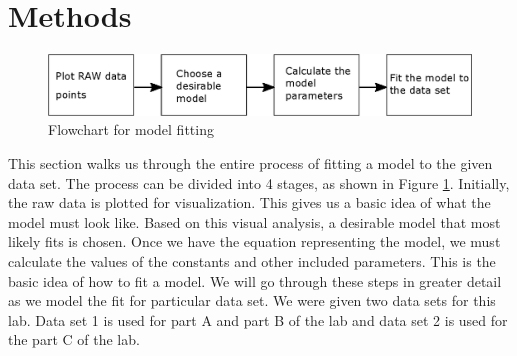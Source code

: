 \documentclass[12pt]{article}
\begin{document}
\section{Methods}
\begin{figure}[h]
\centering
	\includegraphics[width=\textwidth]{flowchart}
	\caption{Flowchart for model fitting }
	\label{fig:flowchart}
\end{figure}
\noindent
This section walks us through the entire process of fitting a model to the given data set. The process can be divided into 4 stages, as shown in Figure \ref{fig:flowchart}. Initially, the raw data is plotted for visualization. This gives us a basic idea of what the model must look like. Based on this visual analysis, a desirable model that most likely fits is chosen. Once we have the equation representing the model, we must calculate the values of the constants and other included parameters. This is the basic idea of how to fit a model. We will go through these steps in greater detail as we model the fit for particular data set. We were given two data sets for this lab. Data set 1 is used for part A and part B of the lab and data set 2 is used for the part C of the lab. 
\end{document}
